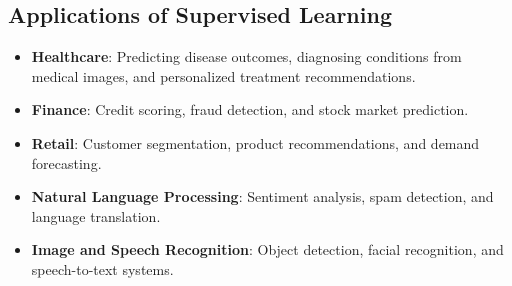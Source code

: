 \subsection*{Applications of Supervised Learning}

\begin{itemize}
    \item \textbf{Healthcare}:
    Predicting disease outcomes, diagnosing conditions from medical images, and personalized treatment recommendations.
    \item \textbf{Finance}:
    Credit scoring, fraud detection, and stock market prediction.
    \item \textbf{Retail}:
    Customer segmentation, product recommendations, and demand forecasting.
    \item \textbf{Natural Language Processing}:
    Sentiment analysis, spam detection, and language translation.
    \item \textbf{Image and Speech Recognition}:
    Object detection, facial recognition, and speech-to-text systems.
\end{itemize}
